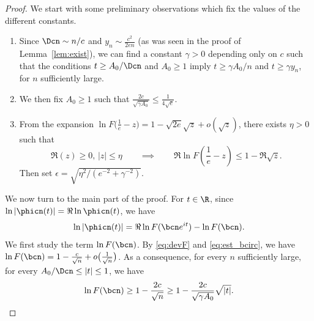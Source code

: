 \begin{proof}We start with some preliminary observations which fix the values of the different constants.
\begin{enumerate}
\item[--]  Since $\Dcn \sim n /c$ and $y_{n} \sim \frac{c^{2}}{2en}$ (as was seen in the proof of Lemma~\ref{lem:exist}),
  we can find a constant $\gamma>0$ depending only on $c$ such that
  the conditions $t \ge  {A_0}/{\Dcn}$ and $A_{0} \geq 1$ imply
  $t \ge {\gamma A_0}/{n}$ and $t \ge \gamma y_{n}$,
  for $n$ sufficiently large.
\item[--] We then fix $A_{0} \geq 1$ such that $\frac{2c}{\sqrt{\gamma A_{0}}} \leq  \frac{1}{4\sqrt{e}}$.
\item[--] From the expansion $ \ln F \big( \tfrac{1}{e}-z \big)= 1-\sqrt{2e} \sqrt{z}+o(\sqrt{z})$, there exists $\eta>0$ such that
\begin{equation}
\label{eq:z} \Re(z) \ge 0, \, |z| \leq \eta  \qquad \implies  \qquad  \Re \ln F \left( \frac{1}{e}-z \right) \leq  1-  \Re \sqrt{z}.
\end{equation}
Then set $\epsilon= \sqrt{\eta^{2}/(e^{-2}+\gamma^{-2})}$.
\end{enumerate}


We now turn to the main part of the proof. For $t \in \R$, since
$ \ln |\phicn(t)| =\Re \ln \phicn(t)$, we have
\begin{equation}
\label{eq:lnphi} \ln |\phicn(t)| =\Re \ln F( \bcn e^{it})- \ln F( \bcn).
\end{equation}
We first study the term $\ln F( \bcn)$.
By \eqref{eq:devF} and \eqref{eq:est_bcirc}, we have $\ln F( \bcn)=1- \tfrac{c}{\sqrt{n}}+ o \big(  \frac{1}{\sqrt{n}} \big)$.  As a consequence, for every $n$ sufficiently large, for every $  {A_{0}}/{\Dcn} \leq |t| \leq 1$, we have
\begin{equation}
\label{eq:ln}\ln F( \bcn) \geq 1- \frac{2c}{\sqrt{n}} \geq 1- \frac{2c}{\sqrt{\gamma A_{0}}} \sqrt{|t|}.
\end{equation}


\end{proof}
